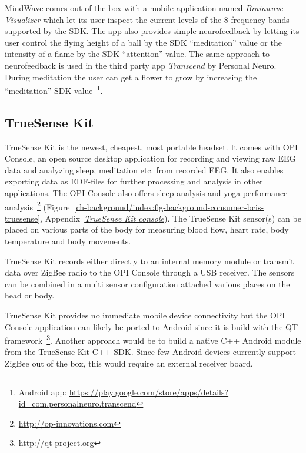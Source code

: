 \documentclass[a4paper,10pt,english,lof,lot,twoside]{puthesis}
\begin{document}
MindWave comes out of the box with a mobile application named \emph{Brainwave
Visualizer} which let its user inspect the current levels of the 8 frequency
bands supported by the SDK. The app also provides simple neurofeedback by
letting its user control the flying height of a ball by the SDK ``meditation''
value or the intensity of a flame by the SDK ``attention'' value. The same
approach to neurofeedback is used in the third party app \emph{Transcend} by Personal
Neuro. During meditation the user can get a flower to grow by increasing the
``meditation'' SDK value \footnote{
Android app: \href{https://play.google.com/store/apps/details?id=com.personalneuro.transcend}{https://play.google.com/store/apps/details?id=com.personalneuro.transcend}
}.


\subsection{TrueSense Kit}
\label{ch-background/index:ch-background-truesense-kit}\label{ch-background/index:truesense-kit}
TrueSense Kit is the newest, cheapest, most portable headset. It comes with OPI
Console, an open source desktop application for recording and viewing raw EEG
data and analyzing sleep, meditation etc. from recorded EEG. It also enables exporting data as
EDF-files for further processing and analysis in other applications. The OPI
Console also offers sleep analysis and yoga performance analysis \footnote{
\href{http://op-innovations.com}{http://op-innovations.com}
} (Figure \ref{ch-background/index:fig-background-consumer-bcis-truesense}, Appendix {\hyperref[appendix_background_truesense_console:appendix-background-truesense-console]{\emph{TrueSense Kit console}}}). The TrueSense Kit sensor(s) can
be placed on various parts of the body for measuring blood flow, heart rate, body
temperature and body movements.

TrueSense Kit records either directly to an internal memory module or transmit
data over ZigBee radio to the OPI Console through a USB receiver. The sensors
can be combined in a multi sensor configuration attached various places on the
head or body.

TrueSense Kit provides no immediate mobile device connectivity but the OPI Console
application can likely be ported to Android since it is build with the QT
framework \footnote{
\href{http://qt-project.org}{http://qt-project.org}
}. Another approach would be to build a
native C++ Android module from the TrueSense Kit C++ SDK. Since few Android
devices currently support ZigBee out of the box, this would require an
external receiver board.
\end{document}
